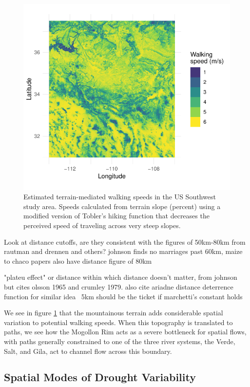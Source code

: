 \documentclass[fleqn,10pt]{wlscirep}
\begin{document}
\begin{figure}[ht]
\centering
\includegraphics[width=.8\linewidth]{figures/walking_speed.pdf}
\caption{Estimated terrain-mediated walking speeds in the US Southwest study area. Speeds calculated from terrain slope (percent) using a modified version of Tobler's hiking function that decreases the perceived speed of traveling across very steep slopes.}
\label{fig:walking-speed}
\end{figure}

Look at distance cutoffs, are they consistent with the figures of 50km-80km from rautman and drennen and others? johnson finds no marriages past 60km, maize to chaco papers also have distance figure of 80km

"plateu effect" or distance within which distance doesn't matter, from johnson but cites olsson 1965 and crumley 1979. also cite ariadne distance deterrence function for similar idea
~5km should be the ticket if marchetti's constant holds

We see in figure \ref{fig:walking-speed} that the mountainous terrain adds considerable spatial variation to potential walking speeds. When this topography is translated to paths, we see how the Mogollon Rim acts as a severe bottleneck for spatial flows, with paths generally constrained to one of the three river systems, the Verde, Salt, and Gila, act to channel flow across this boundary.  

\subsection*{Spatial Modes of Drought Variability}
\end{document}
